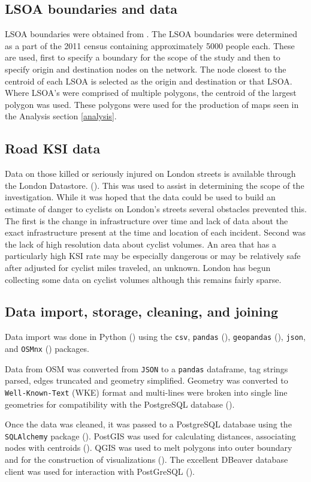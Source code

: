 \subsection{LSOA boundaries and data}
	
LSOA boundaries were obtained from  \cite{lsoageoms}. The LSOA boundaries were determined as a part of the 2011 census containing approximately 5000 people each. These are used, first to specify a boundary for the scope of the study and then to specify origin and destination nodes on the network. The node closest to the centroid of each LSOA is selected as the origin and destination or that LSOA. Where LSOA's were comprised of multiple polygons, the centroid of the largest polygon was used. These polygons were used for the production of maps seen in the Analysis section \ref{analysis}. 
	
\subsection{Road KSI data}

Data on those killed or seriously injured on London streets is available through the London Datastore. (\cite{cyclistksi}). This was used to assist in determining the scope of the investigation. While it was hoped that the data could be used to build an estimate of danger to cyclists on London's streets several obstacles prevented this. The first is the change in infrastructure over time and lack of data about the exact infrastructure present at the time and location of each incident. Second was the lack of high resolution data about cyclist volumes. An area that has a particularly high KSI rate may be especially dangerous or may be relatively safe after adjusted for cyclist miles traveled, an unknown. London has begun collecting some data on cyclist volumes although this remains fairly sparse. 
	
\subsection{Data import, storage, cleaning, and joining}

Data import was done in Python (\cite{python}) using the \texttt{csv}, \texttt{pandas} (\cite{pandas}), \texttt{geopandas} (\cite{geopandas}), \texttt{json}, and \texttt{OSMnx} (\cite{osmnx}) packages. 

Data from OSM was converted from \texttt{JSON} to a \texttt{pandas} dataframe, tag strings parsed, edges truncated and geometry simplified. Geometry was converted to \texttt{Well-Known-Text} (WKE) format and multi-lines were broken into single line geometries for compatibility with the PostgreSQL database (\cite{postgres}). 

Once the data was cleaned, it was passed to a PostgreSQL database using the \texttt{SQLAlchemy} package (\cite{bayer2010sqlalchemy}). PostGIS was used for calculating distances, associating nodes with centroids (\cite{postgis}). QGIS was used to melt polygons into outer boundary and for the construction of visualizations (\cite{qgis}). The excellent DBeaver database client was used for interaction with PostGreSQL (\cite{dbeaver}).